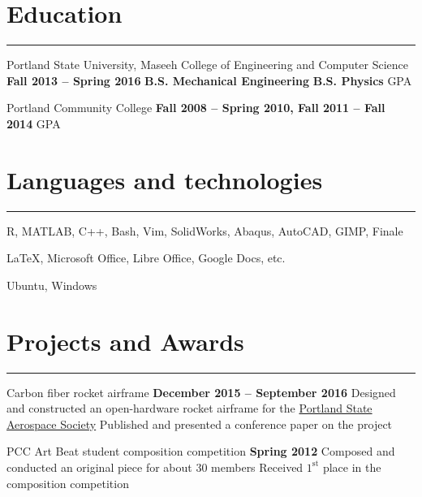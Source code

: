 \section{Education}
	\noindent\rule{\textwidth}{\hlinewidth}
	\begin{innerlist}
	\item Portland State University, Maseeh College of Engineering and Computer Science 
		\hfill\textbf{Fall 2013 -- Spring 2016}
		\subitem \textbf{B.S. Mechanical Engineering }
		\subitem\textbf{B.S. Physics}
		 GPA
	\\
	\item Portland Community College  \hfill\textbf{Fall 2008 -- Spring 2010, Fall 2011 -- Fall 2014}
		 GPA
	\end{innerlist}

\section{Languages and technologies}

\noindent\rule{\textwidth}{\hlinewidth}
    \begin{innerlist}
        \item R, MATLAB, C++, Bash, Vim, SolidWorks, Abaqus, AutoCAD, GIMP, Finale
        \item \LaTeX, Microsoft Office, Libre Office, Google Docs, etc.
	\item Ubuntu, Windows
    \end{innerlist}

\section{Projects and Awards}
\noindent\rule{\textwidth}{\hlinewidth}
	\begin{innerlist}
	\item Carbon fiber rocket airframe	
		\hfill\textbf{December 2015 -- September 2016} %
		\subitem Designed and constructed an open-hardware rocket airframe for the 
			\href{http://psas.pdx.edu/}{Portland State Aerospace Society}
		\subitem Published and presented a conference paper on the project
	\\
	\item PCC Art Beat student composition competition \hfill\textbf{Spring 2012}
		\subitem Composed and conducted an original piece for about 30 members
		\subitem Received $1^\text{st}$ place in the composition competition
	\end{innerlist}

